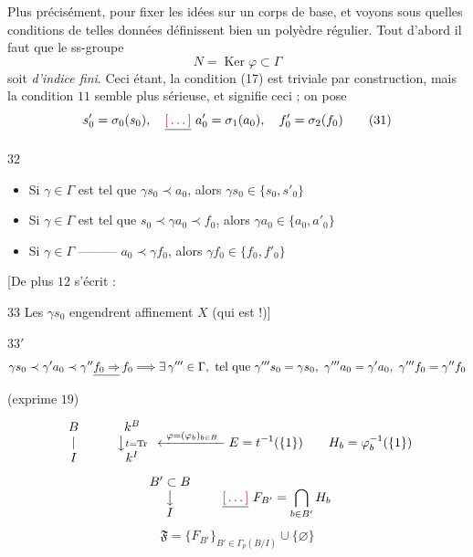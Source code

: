 \documentclass[11pt,a4paper]{article}
\begin{document}
Plus précisément, pour fixer les idées sur un corps de base, et voyons sous quelles conditions de telles données définissent bien un polyèdre régulier. Tout d'abord il faut que le ss-groupe 
\[
N = \operatorname{Ker} \varphi \subset \Gamma \tag{30}
\]
soit \emph{d'indice fini}. Ceci étant, la condition  (17) est triviale par construction, mais la condition $\boxed{11}$ semble plus sérieuse, et signifie ceci ; on pose
\[
s'_0 = \sigma_0(s_0), \quad \struck{\ill{}}\ a'_0 = \sigma_1(a_0), \quad f'_0 = \sigma_2(f_0) \tag{31}
\]

$\boxed{32}$
\begin{itemize}
  \item[a)] Si $\gamma \in \Gamma$ est tel que $\gamma s_0 \prec a_0$, alors $\gamma s_0 \in \{s_0, s'_0\}$
  \item[b)] Si $\gamma \in \Gamma$ est tel que $s_0 \prec \gamma a_0 \prec f_0$, alors $\gamma a_0 \in \{a_0, a'_0\}$
  \item[c)] Si $\gamma \in \Gamma$ ——— \struck{$\gamma$} $a_0 \prec \gamma f_0$, alors $\gamma f_0 \in \{f_0, f'_0\}$
\end{itemize}

[De plus $\boxed{12}$ s'écrit :

$\boxed{33}$ Les \struck{\ill{}} $\gamma s_0$ engendrent affinement $X$ (qui est  !)]

$\boxed{33'}$
\[
\gamma s_0 \prec \gamma' a_0 \prec \gamma'' \struck{f_0 \Rightarrow}\, f_0 \Longrightarrow \exists\, \gamma''' \in \Gamma, \text{ tel que } \gamma''' s_0 = \gamma s_0,\ \gamma''' a_0 = \gamma' a_0,\ \gamma''' f_0 = \gamma'' f_0
\]
(exprime $\boxed{19}$)

\[
\begin{array}{c} B \\ | \\ I \end{array}
\qquad
\begin{array}{c} k^B \\ \big\downarrow{\scriptstyle t = \operatorname{Tr}} \\ k^I \end{array}
\xleftarrow{\ \varphi = (\varphi_b)_{b \in B}\ } E = t^{-1}(\{1\})
\qquad
H_b = \varphi_b^{-1}(\{1\})
\]
\[
\begin{array}{c} B' \subset B \\ \big\downarrow \\ I \end{array}
\qquad
\struck{\ill{}}\ F_{B'} = \bigcap_{b \in B'} H_b
\]
\[
\mathfrak{F} = \{F_{B'}\}_{B' \in \Gamma_p(B/I)} \cup \{\varnothing\}
\]
\end{document}
